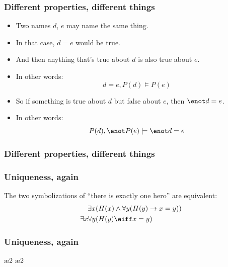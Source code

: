 \begin{frame}
  \frametitle{Different properties, different things}

  \begin{itemize}[<+->]
    \item Two names $d$, $e$ may name the same thing.
    \item In that case, $d = e$ would be true.
    \item And then anything that's true about $d$ is also true about $e$.
    \item In other words: \[d=e,P(d) \models P(e)\]
    \item So if something is true about $d$ but false about $e$, then $\enot d = e$. 
    \item In other words:
    \[P(d), \enot P(e) \models \enot d = e\]
  \end{itemize}
\end{frame}

\begin{frame}
  \frametitle{Different properties, different things}

  \begin{fitchproof}
    \open
    \close
  \end{fitchproof}
\end{frame}

\begin{frame}
  \frametitle{Uniqueness, again}

  The two symbolizations  of ``there is exactly one hero'' are equivalent:
  \begin{align*}
    \exists x&(H(x) \land \forall y(H(y) \to x = y))\\
    \exists x\forall y & (H(y) \eiff x=y)
  \end{align*}
\end{frame}

\begin{frame}
  \frametitle{Uniqueness, again}
  \tiny
  \begin{fitchproof}
    \open
    \open
    \ae{2}
    \close
    \open
    \ae{2}
    \close
    \close
  \end{fitchproof}
\end{frame}

